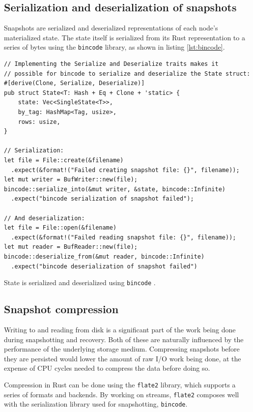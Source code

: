 \documentclass[b5paper]{report}
\begin{document}
\subsection{Serialization and deserialization of snapshots} \label{sec:bincode}
Snapshots are serialized and deserialized representations of each node's
materialized state. The state itself is serialized from its Rust representation
to a series of bytes using the \texttt{bincode} \cite{bincode} library, as shown
in listing \ref{lst:bincode}.

\begin{listing}[H]
  \begin{verbatim}
// Implementing the Serialize and Deserialize traits makes it
// possible for bincode to serialize and deserialize the State struct:
#[derive(Clone, Serialize, Deserialize)]
pub struct State<T: Hash + Eq + Clone + 'static> {
    state: Vec<SingleState<T>>,
    by_tag: HashMap<Tag, usize>,
    rows: usize,
}

// Serialization:
let file = File::create(&filename)
  .expect(&format!("Failed creating snapshot file: {}", filename));
let mut writer = BufWriter::new(file);
bincode::serialize_into(&mut writer, &state, bincode::Infinite)
  .expect("bincode serialization of snapshot failed");

// And deserialization:
let file = File::open(&filename)
  .expect(&format!("Failed reading snapshot file: {}", filename));
let mut reader = BufReader::new(file);
bincode::deserialize_from(&mut reader, bincode::Infinite)
  .expect("bincode deserialization of snapshot failed")
  \end{verbatim}
  \caption{
    State is serialized and deserialized using \texttt{bincode} \cite{bincode}.
    \label{lst:bincode}
  }
\end{listing}

\subsection{Snapshot compression} \label{sec:compression}
Writing to and reading from disk is a significant part of the work being done
during snapshotting and recovery. Both of these are naturally influenced by the
performance of the underlying storage medium. Compressing snapshots before they
are persisted would lower the amount of raw I/O work being done, at the expense
of CPU cycles needed to compress the data before doing so.

Compression in Rust can be done using the \texttt{flate2} \cite{flate2} library,
which supports a series of formats and backends. By working on streams,
\texttt{flate2} composes well with the serialization library used for
snapshotting, \texttt{bincode}.
\end{document}
